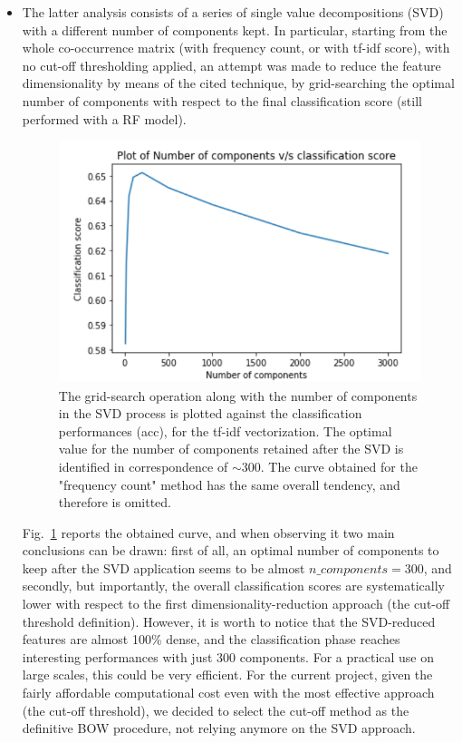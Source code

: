 \documentclass[10pt]{article}
\begin{document}
\begin{itemize}
\item The latter analysis consists of a series of single value decompositions (SVD) with a different number of components kept. In particular, starting from the whole co-occurrence matrix (with frequency count, or with tf-idf score), with no cut-off thresholding applied, an attempt was made to reduce the feature dimensionality by means of the cited technique, by grid-searching the optimal number of components with respect to the final classification score (still performed with a RF model). 
\begin{figure}
\centering
\includegraphics[scale=0.3]{figs/svd.png}
\caption{\label{fig:svd}The grid-search operation along with the number of components in the SVD process is plotted against the classification performances (acc), for the tf-idf vectorization. The optimal value for the number of components retained after the SVD is identified in correspondence of $\sim 300$. The curve obtained for the "frequency count" method has the same overall tendency, and therefore is omitted. }
\end{figure}
Fig.~\ref{fig:svd} reports the obtained curve, and when observing it two main conclusions can be drawn: first of all, an optimal number of components to keep after the SVD application seems to be almost $n\_components = 300$, and secondly, but importantly, the overall classification scores are systematically lower with respect to the first dimensionality-reduction approach (the cut-off threshold definition).
However, it is worth to notice that the SVD-reduced features are almost 100\% dense, and the classification phase reaches interesting performances with just 300 components. For a practical use on large scales, this could be very efficient. For the current project, given the fairly affordable computational cost even with the most effective approach (the cut-off threshold), we decided to select the cut-off method as the definitive BOW procedure, not relying anymore on the SVD approach.
\end{itemize}
\end{document}

